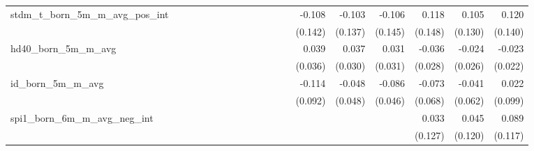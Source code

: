 \begin{tabular}{lrrrrrrrrrrrrrrrrrr}
stdm\_t\_born\_5m\_m\_avg\_pos\_int         &             &             &             &             &             &             &             &             &             &             &             &             &      -0.108 &      -0.103 &      -0.106 &       0.118 &       0.105 &       0.120 \\ 
                                            &             &             &             &             &             &             &             &             &             &             &             &             &     (0.142) &     (0.137) &     (0.145) &     (0.148) &     (0.130) &     (0.140) \\ 
hd40\_born\_5m\_m\_avg                      &             &             &             &             &             &             &             &             &             &             &             &             &       0.039 &       0.037 &       0.031 &      -0.036 &      -0.024 &      -0.023 \\ 
                                            &             &             &             &             &             &             &             &             &             &             &             &             &     (0.036) &     (0.030) &     (0.031) &     (0.028) &     (0.026) &     (0.022) \\ 
id\_born\_5m\_m\_avg                        &             &             &             &             &             &             &             &             &             &             &             &             &      -0.114 &      -0.048 &      -0.086 &      -0.073 &      -0.041 &       0.022 \\ 
                                            &             &             &             &             &             &             &             &             &             &             &             &             &     (0.092) &     (0.048) &     (0.046) &     (0.068) &     (0.062) &     (0.099) \\ 
spi1\_born\_6m\_m\_avg\_neg\_int            &             &             &             &             &             &             &             &             &             &             &             &             &             &             &             &       0.033 &       0.045 &       0.089 \\ 
                                            &             &             &             &             &             &             &             &             &             &             &             &             &             &             &             &     (0.127) &     (0.120) &     (0.117) \\ 

\end{tabular}
